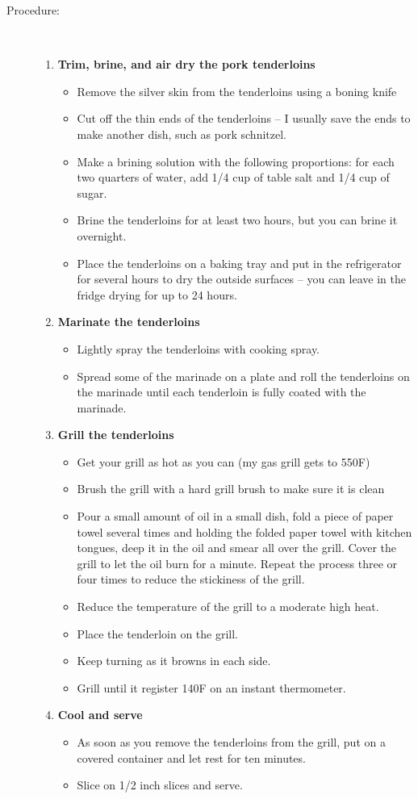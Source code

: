 \documentclass[11pt,letterpaper]{article}
\begin{document}
\begin{description}
\item[Procedure:]\ \\
	\begin{enumerate}
	\item {\bf Trim, brine, and air dry the pork tenderloins}
	\begin{itemize}
	\item Remove the silver skin from the tenderloins using a boning knife
        \item Cut off the thin ends of the tenderloins -- I usually save the ends to make another dish, such as pork schnitzel.
	\item Make a brining solution with the following proportions: for each  two quarters of water, add 1/4 cup of table salt and 1/4 cup of sugar.
        \item Brine the tenderloins for at least two hours, but you can brine it overnight.
        \item Place the tenderloins on a baking tray and put in the refrigerator for several hours to dry the outside surfaces -- you can leave in the fridge drying for up to 24 hours.
	\end{itemize}
	\item {\bf Marinate the tenderloins}
	\begin{itemize}
	\item Lightly spray the tenderloins with cooking spray.
	\item Spread some of the marinade on a plate and roll the tenderloins on the marinade until each tenderloin is fully coated with the marinade.
	\end{itemize}
	\item {\bf Grill the tenderloins}
	\begin{itemize}
	\item Get your grill as hot as you can (my gas grill gets to 550F)
	 \item Brush the grill with a hard grill brush to make sure it is clean
	 \item Pour a small amount of oil in a small dish, fold a piece of paper towel several times and holding the folded paper towel with kitchen tongues, deep it in the oil and smear all over the grill. Cover the grill to let the oil burn for a minute. Repeat the process three or four times to reduce the stickiness of the grill. 
	\item Reduce the temperature of the grill to a moderate high heat.
	\item Place the tenderloin on the grill.
	\item Keep turning as it browns in each side.
	\item Grill until it register 140F on an instant thermometer.
	\end{itemize}
	\item {\bf Cool and serve}
	\begin{itemize}
	\item As soon as you remove the tenderloins from the grill, put on a covered container and let rest for ten minutes.
	\item Slice  on 1/2 inch slices and serve.
	\end{itemize}
	\end{enumerate}
\end{description}
\end{document}
